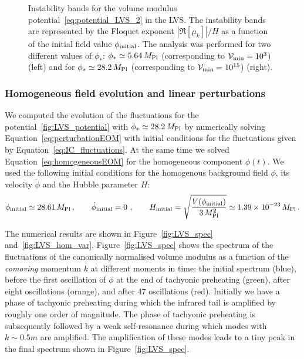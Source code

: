 \documentclass[12pt]{article}
\newcommand{\be}{\begin{equation}}
\newcommand{\ee}{\end{equation}}
\begin{document}
\begin{figure}
\centering
{}
\hfill
{}
\caption{Instability bands for the volume modulus potential~\eqref{eq:potential_LVS_2} in the LVS. The instability bands are represented by the Floquet exponent $|\Re[\mu_k]|/H$ as a function of the initial field value $\phi_{\rm initial}$. The analysis was performed for two different values of $\phi_*$: $\phi_* \simeq 5.64 \,M_{\rm Pl}$ (corresponding to $\mathcal{V}_{\rm min}=10^{3}$) (left) and for $\phi_* \simeq 28.2 \,M_{\rm Pl}$ (corresponding to $\mathcal{V}_{\rm min}=10^{15}$) (right).}
\label{fig:floquet_LVS}
\end{figure}

\subsubsection{Homogeneous field evolution and linear perturbations}
\label{sec:linear_LVS}
We computed the evolution of the fluctuations for the potential~\ref{fig:LVS_potential} with $\phi_* \simeq 28.2\,M_{\rm Pl}$ by numerically solving Equation~\eqref{eq:perturbationEOM} with initial conditions for the fluctuations given by Equation~\eqref{eq:IC_fluctuations}. At the same time we solved Equation~\eqref{eq:homogeneousEOM} for the homogeneous component $\phi(t)$. We used the following initial conditions for the homogenous background field $\phi$, its velocity $\dot{\phi}$ and the Hubble parameter $H$:
\be
\phi_{\rm initial} \simeq 28.61\,M_{\rm Pl}\,, \qquad\dot{\phi}_{\rm initial} = 0\,\,,\qquad H_{\rm initial}=\sqrt{\frac{V(\phi_{\rm initial})}{3\,M^2_{\rm Pl}}} \simeq 1.39\times10^{-23}\,M_{\rm Pl}\,.
\ee

The numerical results are shown in Figure~\ref{fig:LVS_spec} and~\ref{fig:LVS_hom_var}. Figure~\ref{fig:LVS_spec} shows the spectrum of the fluctuations of the canonically normalised volume modulus as a function of the \textit{comoving} momentum $k$ at different moments in time: the initial spectrum (blue), before the first oscillation of $\phi$ at the end of tachyonic preheating (green), after eight oscillations (orange), and after 47 oscillations (red). 
Initially we have a phase of tachyonic preheating during which the infrared tail is amplified by roughly one order of magnitude. The phase of tachyonic preheating is subsequently followed by a weak self-resonance during which modes with $k\sim 0.5 m$ are amplified. The amplification of these modes leads to a tiny peak in the final spectrum shown in Figure~\ref{fig:LVS_spec}.
\end{document}
